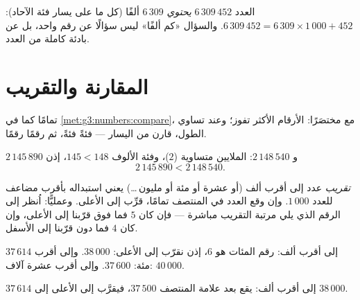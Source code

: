 \begin{example}[كم ألفًا؟]\label{ex:g4:numbers:contained}
العدد $6\,309\,452$ \emph{يحتوي} $6\,309$ ألفًا
(كل ما على يسار فئة الآحاد): $6\,309\,452 = 6\,309 \times
1\,000 + 452$. والسؤال «كم ألفًا» ليس سؤالًا عن رقم واحد،
بل عن بادئة كاملة من العدد.
\end{example}

\section{المقارنة والتقريب}

\begin{method}\label{met:g4:numbers:compare}
تمامًا كما في \cref{met:g3:numbers:compare}، مع 
مختصَرًا: الأرقام الأكثر تفوز؛ وعند تساوي الطول، قارن من اليسار
--- فئةً فئةً، ثم رقمًا رقمًا.
\end{method}

\begin{example}\label{ex:g4:numbers:compare}
$2\,145\,890$ و $2\,148\,540$: الملايين متساوية ($2$)، وفئة
الألوف $145 < 148$، إذن
\[
2\,145\,890 < 2\,148\,540 .
\]
\end{example}

\begin{definition}[التقريب]\label{def:g4:numbers:round}
\emph{تقريب} عدد إلى أقرب ألف (أو عشرة أو مئة أو
مليون\,\dots) يعني استبداله بأقرب مضاعف للعدد $1\,000$. وإن وقع
العدد في المنتصف تمامًا، قرِّب إلى الأعلى. وعمليًّا: اُنظر إلى
الرقم الذي يلي مرتبة التقريب مباشرة --- فإن كان $5$ فما فوق
قرّبنا إلى الأعلى، وإن كان $4$ فما دون قرّبنا إلى الأسفل.
\end{definition}

\begin{example}\label{ex:g4:numbers:round}
 $37\,614$ إلى أقرب ألف: رقم المئات هو
$6$، إذن نقرّب إلى الأعلى: $38\,000$. وإلى أقرب مئة:
$37\,600$. وإلى أقرب عشرة آلاف: $40\,000$.
\end{example}

\begin{omfigure}

{\small {} $37\,614$ إلى أقرب ألف: يقع بعد علامة
المنتصف $37\,500$، فيقرَّب إلى الأعلى إلى $38\,000$.}
\end{omfigure}

